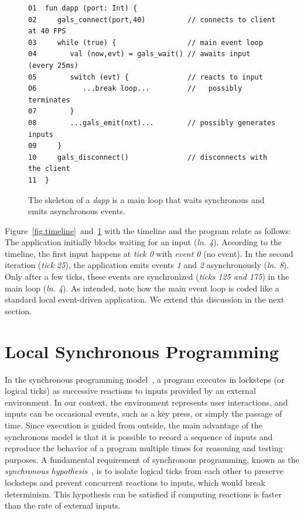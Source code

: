 \documentclass[sigplan,screen]{acmart}
\newcommand{\lin}[1]{(\emph{ln. #1}\xspace)}
\newcommand{\dapp}{\emph{dapp}\xspace}
\begin{document}
\begin{figure}[t]
{\scriptsize
\begin{verbatim}
01  fun dapp (port: Int) {
02     gals_connect(port,40)          // connects to client at 40 FPS
03     while (true) {                 // main event loop
04        val (now,evt) = gals_wait() // awaits input (every 25ms)
05        switch (evt) {              // reacts to input
06           ...break loop...         //   possibly terminates
07        }
08        ...gals_emit(nxt)...        // possibly generates inputs
09     }
10     gals_disconnect()              // disconnects with the client
11  }
\end{verbatim}
}
  \caption{
    \label{fig.skel}
    The skeleton of a \dapp is a main loop that waits synchronous and emits
    asynchronous events.
  }
\end{figure}

Figure~\ref{fig.timeline}~and~\ref{fig.skel} with the timeline and the program
relate as follows:
The application initially blocks waiting for an input \lin{4}.
According to the timeline, the first input happens at \emph{tick 0} with
\emph{event 0} (no event).
In the second iteration (\emph{tick 25}), the application emits events \emph{1}
and \emph{2} asynchronously \lin{8}.
Only after a few ticks, these events are synchronized (\emph{ticks 125 and 175})
in the main loop \lin{4}.
As intended, note how the main event loop is coded like a standard local
event-driven application.
We extend this discussion in the next section.

\section{Local Synchronous Programming}
\label{sec.sync}

In the synchronous programming model~\cite{sync}, a program executes in
locksteps (or logical ticks) as successive reactions to inputs provided by an
external environment.
In our context, the environment represents user interactions, and inputs can be
occasional events, such as a key press, or simply the passage of time.
Since execution is guided from outside, the main advantage of the synchronous
model is that it is possible to record a sequence of inputs and reproduce the
behavior of a program multiple times for reasoning and testing purposes.
A fundamental requirement of synchronous programming, known as the
\emph{synchronous hypothesis}~\cite{hypo}, is to isolate logical ticks from
each other to preserve locksteps and prevent concurrent reactions to inputs,
which would break determinism.
This hypothesis can be satisfied if computing reactions is faster than the rate
of external inputs.
\end{document}
